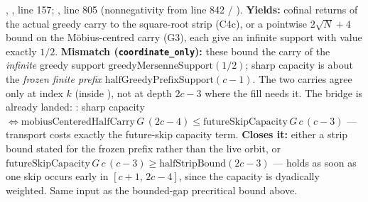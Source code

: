 \begin{obs} 
,
, line 157;
,
line 805 (nonnegativity from line 842 /
).
\textbf{Yields:} cofinal returns of the actual greedy carry to the square-root strip (C4c), or a
pointwise $2\sqrt N+4$ bound on the Möbius-centred carry (G3), each give an infinite support with
value exactly $1/2$.
\textbf{Mismatch (\texttt{coordinate\_only}):} these bound the carry of the \emph{infinite}
greedy support $\mathrm{greedyMersenneSupport}(1/2)$; sharp capacity is about the \emph{frozen
finite prefix} $\mathrm{halfGreedyPrefixSupport}(c{-}1)$. The two carries agree only at index $k$
(inside ),
not at depth $2c{-}3$ where the fill needs it. The bridge is already landed:
:
sharp capacity $\Leftrightarrow \mathrm{mobiusCenteredHalfCarry}\,G\,(2c{-}4) \le
\mathrm{futureSkipCapacity}\,G\,c\,(c{-}3)$ — transport costs exactly the future-skip capacity
term.
\textbf{Closes it:} either a strip bound stated for the frozen prefix rather than the live orbit,
or $\mathrm{futureSkipCapacity}\,G\,c\,(c{-}3) \ge \mathrm{halfStripBound}(2c{-}3)$ — holds as
soon as one skip occurs early in $[c{+}1,\,2c{-}4]$, since the capacity is dyadically weighted.
Same input as the bounded-gap precritical bound above.
\end{obs}

